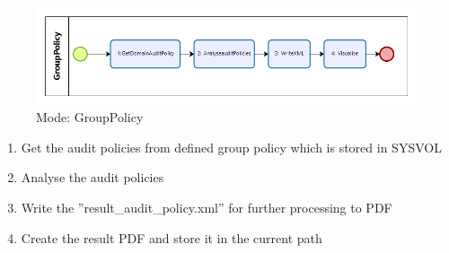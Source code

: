 \clearpage

\begin{figure}[H]
    \centering
    \includegraphics[width=1\linewidth]{assets/modes/grouppolicy.png}
    \caption{Mode: GroupPolicy}
\end{figure}
\begin{enumerate}
    \item Get the audit policies from defined group policy which is stored in SYSVOL
    \item Analyse the audit policies
    \item Write the ''result\_audit\_policy.xml'' for further processing to PDF
    \item Create the result PDF and store it in the current path
\end{enumerate}